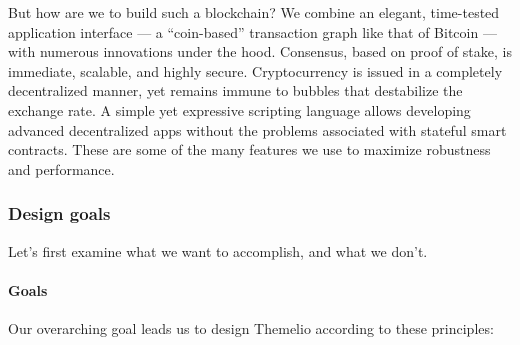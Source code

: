 \documentclass[]{article}
\let\oldparagraph\paragraph
\renewcommand{\paragraph}[1]{\oldparagraph{#1}\mbox{}}
\begin{document}
But how are we to build such a blockchain? We combine an elegant,
time-tested application interface --- a ``coin-based'' transaction graph
like that of Bitcoin --- with numerous innovations under the hood.
Consensus, based on proof of stake, is immediate, scalable, and highly
secure. Cryptocurrency is issued in a completely decentralized manner,
yet remains immune to bubbles that destabilize the exchange rate. A
simple yet expressive scripting language allows developing advanced
decentralized apps without the problems associated with stateful smart
contracts. These are some of the many features we use to maximize
robustness and performance.

\hypertarget{design-goals}{%
\subsubsection{Design goals}\label{design-goals}}

Let's first examine what we want to accomplish, and what we don't.

\hypertarget{goals}{%
\paragraph{Goals}\label{goals}}

Our overarching goal leads us to design Themelio according to these
principles:
\end{document}
